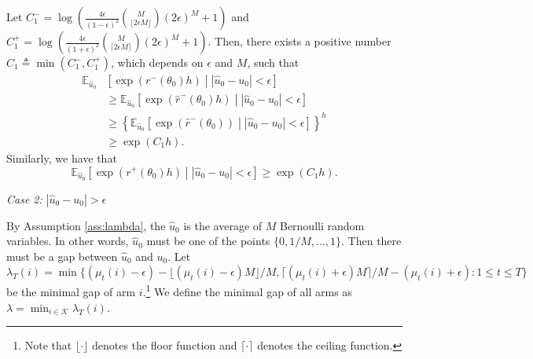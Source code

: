 \documentclass[letterpaper]{article} %
\begin{document}
Let $C_1^-=\log\left(\frac{4\epsilon}{(1-\epsilon)^2}\binom{M}{\lfloor 2\epsilon M\rfloor}(2\epsilon)^M+1\right)$ and $C_1^+=\log\left(\frac{4\epsilon}{(1+\epsilon)^2}\binom{M}{\lceil 2\epsilon M\rceil}(2\epsilon)^M+1\right)$. Then, there exists a positive number $C_1\triangleq\min(C_1^-,C_1^+)$, which depends on $\epsilon$ and $M$, such that
\begin{align}
\mathbb{E}_{\hat{u}_0}&\left[\exp(r^-(\theta_0)h)\middle||\hat{u}_0-u_0|<\epsilon\right]\\
&\geq\mathbb{E}_{\hat{u}_0}\left[\exp(\hat{r}^-(\theta_0)h)\middle||\hat{u}_0-u_0|<\epsilon\right]\\
&\geq\left\{\mathbb{E}_{\hat{u}_0}\left[\exp(\hat{r}^-(\theta_0))\middle||\hat{u}_0-u_0|<\epsilon\right]\right\}^h\\\label{case1F1}
&\geq \exp(C_1h).
\end{align}
Similarly, we have that
\begin{equation}\label{case1F2}
\mathbb{E}_{\hat{u}_0}\left[\exp(r^+(\theta_0)h)\middle||\hat{u}_0-u_0|<\epsilon\right]\geq\exp(C_1h).
\end{equation}

\emph{Case 2:} $|\hat{u}_0-u_0|>\epsilon$

By Assumption \ref{ass:lambda}, the $\hat{u}_0$ is the average of $M$ Bernoulli random variables. In other words, $\hat{u}_0$ must be one of the points $\{0,1/M,\ldots,1\}$. Then there must be a gap between $\hat{u}_0$ and $u_0$. Let $\lambda_T(i)=\min\{(\mu_t(i)-\epsilon)-{\lfloor (\mu_t(i)-\epsilon)M\rfloor}/{M}, {\lceil (\mu_t(i)+\epsilon)M\rceil}/{M}-(\mu_t(i)+\epsilon):1\leq t \leq T\}$ be the minimal gap of arm $i$.\footnote{Note that $\lfloor\cdot\rfloor$ denotes the floor function and $\lceil\cdot\rceil$ denotes the ceiling function.} We define the minimal gap of all arms as $\lambda=\min_{i\in\mathcal{K}}\lambda_T(i)$.
\end{document}
